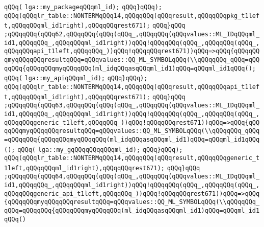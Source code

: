 \verb|qQQq(|\newline
\verb|lga::my_packageqQQqml_id);|\newline
\verb|qQQq}qQQq);|\newline
\verb|qQQq(qQQqlr_table::NONTERMqQQq14,qQQqqQQq(qQQqresult,qQQqqQQqpkg_t1left,qQQqqQQqml_id1right),qQQqqQQqrest671);|\newline
\verb|qQQq}qQQq|\newline
\verb|;qQQqqQQq(qQQq62,qQQqqQQq(qQQq(qQQq_,qQQqqQQq(qQQqvalues::ML_IDqQQqml_id1,qQQqqQQq_,qQQqqQQqml_id1right))qQQq!qQQqqQQq(qQQq_,qQQqqQQq(qQQq_,qQQqqQQqapi_t1left,qQQqqQQq_))qQQq!qQQqqQQqrest671))qQQq=>qQQq{qQQqqQQqmyqQQqqQQqresultqQQq=qQQqvalues::QQ_ML_SYMBOLqQQq(\\qQQqqQQq_qQQq=qQQqqQQq{qQQqqQQqmyqQQqqQQq(ml_idqQQqasqQQqml_id1)qQQq=qQQqml_id1qQQq();|\newline
\verb|qQQq(|\newline
\verb|lga::my_apiqQQqml_id);|\newline
\verb|qQQq}qQQq);|\newline
\verb|qQQq(qQQqlr_table::NONTERMqQQq14,qQQqqQQq(qQQqresult,qQQqqQQqapi_t1left,qQQqqQQqml_id1right),qQQqqQQqrest671);|\newline
\verb|qQQq}qQQq|\newline
\verb|;qQQqqQQq(qQQq63,qQQqqQQq(qQQq(qQQq_,qQQqqQQq(qQQqvalues::ML_IDqQQqml_id1,qQQqqQQq_,qQQqqQQqml_id1right))qQQq!qQQqqQQq(qQQq_,qQQqqQQq(qQQq_,qQQqqQQqgeneric_t1left,qQQqqQQq_))qQQq!qQQqqQQqrest671))qQQq=>qQQq{qQQqqQQqmyqQQqqQQqresultqQQq=qQQqvalues::QQ_ML_SYMBOLqQQq(\\qQQqqQQq_qQQq=qQQqqQQq{qQQqqQQqmyqQQqqQQq(ml_idqQQqasqQQqml_id1)qQQq=qQQqml_id1qQQq();|\newline
\verb|qQQq(|\newline
\verb|lga::my_gqQQqqQQqqQQqml_id);|\newline
\verb|qQQq}qQQq);|\newline
\verb|qQQq(qQQqlr_table::NONTERMqQQq14,qQQqqQQq(qQQqresult,qQQqqQQqgeneric_t1left,qQQqqQQqml_id1right),qQQqqQQqrest671);|\newline
\verb|qQQq}qQQq|\newline
\verb|;qQQqqQQq(qQQq64,qQQqqQQq(qQQq(qQQq_,qQQqqQQq(qQQqvalues::ML_IDqQQqml_id1,qQQqqQQq_,qQQqqQQqml_id1right))qQQq!qQQqqQQq(qQQq_,qQQqqQQq(qQQq_,qQQqqQQqgeneric_api_t1left,qQQqqQQq_))qQQq!qQQqqQQqrest671))qQQq=>qQQq{qQQqqQQqmyqQQqqQQqresultqQQq=qQQqvalues::QQ_ML_SYMBOLqQQq(\\qQQqqQQq_qQQq=qQQqqQQq{qQQqqQQqmyqQQqqQQq(ml_idqQQqasqQQqml_id1)qQQq=qQQqml_id1qQQq()|\newline
